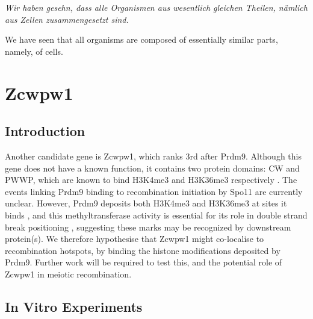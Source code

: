\begin{savequote}[8cm]
\textit{Wir haben gesehn, dass alle Organismen aus wesentlich gleichen Theilen, nämlich aus Zellen zusammengesetzt sind.}

We have seen that all organisms are composed of essentially similar parts, namely, of cells.
\end{savequote}

\chapter{\label{ch:3-Zcw} Zcwpw1}

\minitoc

\section{Introduction}


Another candidate gene is Zcwpw1, which ranks 3rd after Prdm9. Although this gene does not have a known function, it contains two protein domains: CW and PWWP, which are known to bind H3K4me3 and H3K36me3 respectively \cite{He2010-by, Rona2016-fj}. The events linking Prdm9 binding to recombination initiation by Spo11 are currently unclear. However, Prdm9 deposits both H3K4me3 and H3K36me3 at sites it binds \cite{Powers2016-fs}, and this methyltransferase activity is essential for its role in double strand break positioning \cite{Diagouraga2018-ty}, suggesting these marks may be recognized by downstream protein(s). We therefore hypothesise that Zcwpw1 might co-localise to recombination hotspots, by binding the histone modifications deposited by Prdm9. Further work will be required to test this, and the potential role of Zcwpw1 in meiotic recombination.

\section{In Vitro Experiments}

